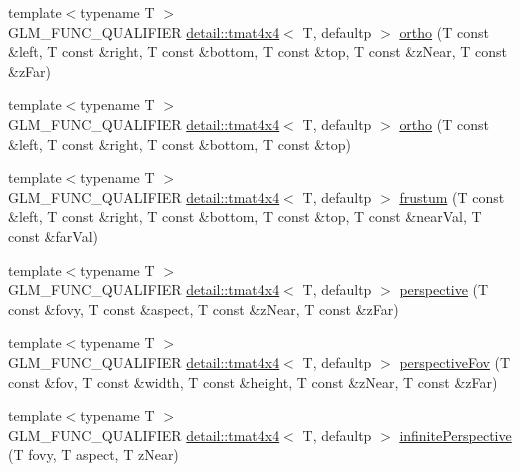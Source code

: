 \begin{DoxyCompactItemize}
\item 
{\footnotesize template$<$typename T $>$ }\\G\+L\+M\+\_\+\+F\+U\+N\+C\+\_\+\+Q\+U\+A\+L\+I\+F\+I\+ER \hyperlink{structglm_1_1detail_1_1tmat4x4}{detail\+::tmat4x4}$<$ T, defaultp $>$ \hyperlink{group__gtc__matrix__transform_gac393e9262776e4980731c386123e4377}{ortho} (T const \&left, T const \&right, T const \&bottom, T const \&top, T const \&z\+Near, T const \&z\+Far)
\item 
{\footnotesize template$<$typename T $>$ }\\G\+L\+M\+\_\+\+F\+U\+N\+C\+\_\+\+Q\+U\+A\+L\+I\+F\+I\+ER \hyperlink{structglm_1_1detail_1_1tmat4x4}{detail\+::tmat4x4}$<$ T, defaultp $>$ \hyperlink{group__gtc__matrix__transform_gab03587bce3510aa5d2f4e5f1be6c2370}{ortho} (T const \&left, T const \&right, T const \&bottom, T const \&top)
\item 
{\footnotesize template$<$typename T $>$ }\\G\+L\+M\+\_\+\+F\+U\+N\+C\+\_\+\+Q\+U\+A\+L\+I\+F\+I\+ER \hyperlink{structglm_1_1detail_1_1tmat4x4}{detail\+::tmat4x4}$<$ T, defaultp $>$ \hyperlink{group__gtc__matrix__transform_ga486d3d6819c04880559f3dccd38f9f58}{frustum} (T const \&left, T const \&right, T const \&bottom, T const \&top, T const \&near\+Val, T const \&far\+Val)
\item 
{\footnotesize template$<$typename T $>$ }\\G\+L\+M\+\_\+\+F\+U\+N\+C\+\_\+\+Q\+U\+A\+L\+I\+F\+I\+ER \hyperlink{structglm_1_1detail_1_1tmat4x4}{detail\+::tmat4x4}$<$ T, defaultp $>$ \hyperlink{group__gtc__matrix__transform_ga6c82aa0ea748cfbb16887d81cf6c5a10}{perspective} (T const \&fovy, T const \&aspect, T const \&z\+Near, T const \&z\+Far)
\item 
{\footnotesize template$<$typename T $>$ }\\G\+L\+M\+\_\+\+F\+U\+N\+C\+\_\+\+Q\+U\+A\+L\+I\+F\+I\+ER \hyperlink{structglm_1_1detail_1_1tmat4x4}{detail\+::tmat4x4}$<$ T, defaultp $>$ \hyperlink{group__gtc__matrix__transform_gac00bf68d4f7ec62380b84c5354567f71}{perspective\+Fov} (T const \&fov, T const \&width, T const \&height, T const \&z\+Near, T const \&z\+Far)
\item 
{\footnotesize template$<$typename T $>$ }\\G\+L\+M\+\_\+\+F\+U\+N\+C\+\_\+\+Q\+U\+A\+L\+I\+F\+I\+ER \hyperlink{structglm_1_1detail_1_1tmat4x4}{detail\+::tmat4x4}$<$ T, defaultp $>$ \hyperlink{group__gtc__matrix__transform_ga63ba1ddb9c4a08d4e58becd0dc5b725a}{infinite\+Perspective} (T fovy, T aspect, T z\+Near)

\end{DoxyCompactItemize}
